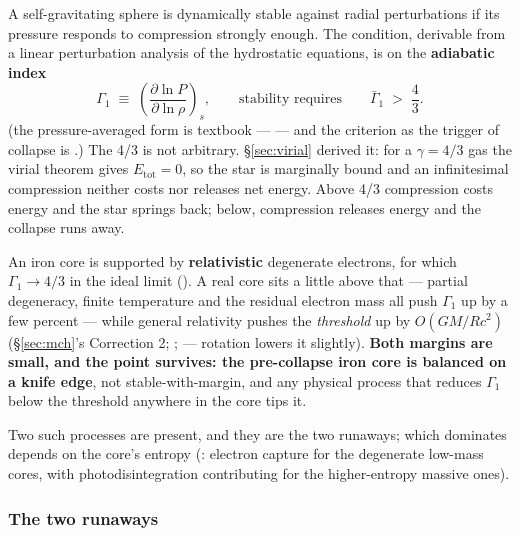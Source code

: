 A self-gravitating sphere is dynamically stable against radial perturbations if
its pressure responds to compression strongly enough. The condition, derivable
from a linear perturbation analysis of the hydrostatic equations, is on the
\textbf{adiabatic index}
%
\begin{equation}
\Gamma_1 \;\equiv\; \left(\frac{\partial \ln P}{\partial \ln \rho}\right)_{s} ,
\qquad\text{stability requires}\qquad \bar\Gamma_1 \;>\; \frac{4}{3}.
\label{eq:gamma1}
\end{equation}
%
(the pressure-averaged form is textbook --- \citealt[\S 6.7]{shapiro1983} ---
and the criterion as the trigger of collapse is \citealt{janka2012}.) The 4/3
is not arbitrary. \S\ref{sec:virial} derived it: for a $\gamma = 4/3$ gas the
virial theorem gives $E_{\mathrm{tot}} = 0$, so the star is marginally bound
and an infinitesimal compression neither costs nor releases net energy. Above
4/3 compression costs energy and the star springs back; below, compression
releases energy and the collapse runs away.

An iron core is supported by \textbf{relativistic} degenerate electrons, for
which $\Gamma_1 \to 4/3$ in the ideal limit (\citealt[\S 2.3]{shapiro1983}). A
real core sits a little above that --- partial degeneracy, finite temperature
and the residual electron mass all push $\Gamma_1$ up by a few percent
 --- while general relativity pushes the
\emph{threshold} up by $O(GM/Rc^2)$ (\S\ref{sec:mch}'s Correction 2;
\citealt{chandrasekhar1964}; \citealt{janka2012, janka2017} --- rotation lowers
it slightly). \textbf{Both margins are small, and the point survives: the
pre-collapse iron core is balanced on a knife edge}, not stable-with-margin,
and any physical process that reduces $\Gamma_1$ below the threshold anywhere
in the core tips it.

Two such processes are present, and they are the two runaways; which dominates
depends on the core's entropy (\citealt{muller2016a}: electron capture for the
degenerate low-mass cores, with photodisintegration contributing for the
higher-entropy massive ones).

\subsubsection{The two runaways}
\label{sec:runaways}

